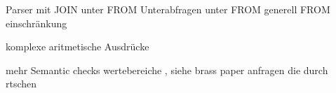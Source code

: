 
Parser mit JOIN unter FROM
Unterabfragen unter FROM
generell FROM einschränkung

komplexe aritmetische Ausdrücke

mehr Semantic checks { wertebereiche , siehe brass paper }
anfragen die durch rtschen